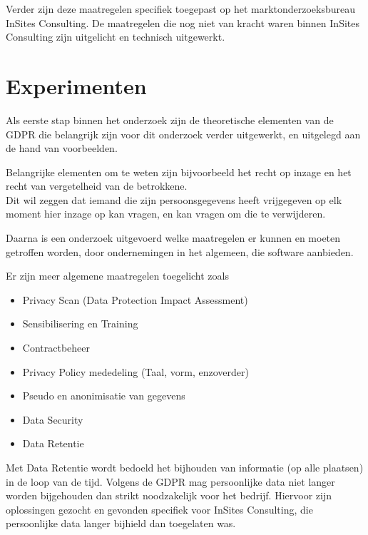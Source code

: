 \documentclass[a0,portrait]{a0poster}
\begin{document}
\begin{multicols}{2}
Verder zijn deze maatregelen specifiek toegepast op het marktonderzoeksbureau InSites Consulting. De maatregelen die nog niet van kracht waren binnen InSites Consulting zijn uitgelicht en technisch uitgewerkt.  

\color{Black} %
\color{HoGentAccent1} 
\section*{Experimenten}
\color{black}
Als eerste stap binnen het onderzoek zijn de theoretische elementen van de GDPR die belangrijk zijn voor dit onderzoek verder uitgewerkt, en uitgelegd aan de hand van voorbeelden. 

Belangrijke elementen om te weten zijn bijvoorbeeld het recht op inzage en het recht van vergetelheid van de betrokkene. \\ Dit wil zeggen dat iemand die zijn persoonsgegevens heeft vrijgegeven op elk moment hier inzage op kan vragen, en kan vragen om die te verwijderen. 

Daarna is een onderzoek uitgevoerd welke maatregelen er kunnen en moeten getroffen worden, door ondernemingen in het algemeen, die software aanbieden. 

Er zijn meer algemene maatregelen toegelicht zoals 

\begin{itemize}
    \item Privacy Scan (Data Protection Impact Assessment)
    \item Sensibilisering en Training
    \item Contractbeheer
    \item Privacy Policy mededeling (Taal, vorm, enzoverder)
    \item Pseudo en anonimisatie van gegevens
    \item Data Security 
    \item Data Retentie
\end{itemize}

Met Data Retentie wordt bedoeld het bijhouden van informatie (op alle plaatsen) in de loop van de tijd. Volgens de GDPR mag persoonlijke data niet langer worden bijgehouden dan strikt noodzakelijk voor het bedrijf. Hiervoor zijn oplossingen gezocht en gevonden specifiek voor InSites Consulting, die persoonlijke data langer bijhield dan toegelaten was. 


\end{multicols}
\end{document}
